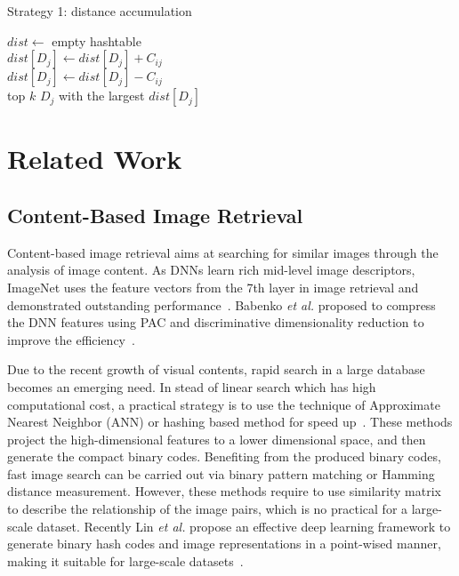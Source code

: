 \begin{algorithm}[th!]
\small
    \caption{Strategy 1: distance accumulation}
    $dist \leftarrow$ empty hashtable \\
     {
         {
             {
                 {
                    $dist[D_j] \leftarrow dist[D_j] + C_{ij}$ \\
                } {
                    $dist[D_j] \leftarrow dist[D_j] - C_{ij}$ \\
                }
            }
        }
    }
    \Return top $k$ $D_j$ with the largest $dist[D_j]$
    \label{alg:accumulation}
\end{algorithm}

\section{Related Work}
\subsection{Content-Based Image Retrieval}
Content-based image retrieval aims at searching for similar images
through the analysis of image content. As DNNs learn rich mid-level
image descriptors, ImageNet uses the feature vectors from the 7th
layer in image retrieval and demonstrated outstanding
performance~\cite{krizhevsky2012imagenet}. Babenko \textit{et al.}
proposed to compress the DNN features using PAC and discriminative
dimensionality reduction to improve the efficiency~\cite{babenko2014neural}.

Due to the recent growth of visual contents, rapid search in a large
database becomes an emerging need. In stead of linear search which has
high computational cost, a practical strategy is to use the technique
of Approximate Nearest Neighbor (ANN) or hashing based method for
speed up~\cite{gionis1999similarity,weiss2009spectral,kulis2009learning,
norouzi2011minimal,liu2012supervised,xia2014supervised}. These methods
project the high-dimensional features to a lower dimensional space, and
then generate the compact binary codes. Benefiting from the produced
binary codes, fast image search can be carried out via binary pattern
matching or Hamming distance measurement. However, these methods require
to use similarity matrix to describe the relationship of the image pairs, which
is no practical for a large-scale dataset. Recently Lin \textit{et al.}
propose an effective deep learning framework to generate binary hash codes
and image representations in a point-wised manner, making it suitable
for large-scale datasets~\cite{lin2015deep}.

